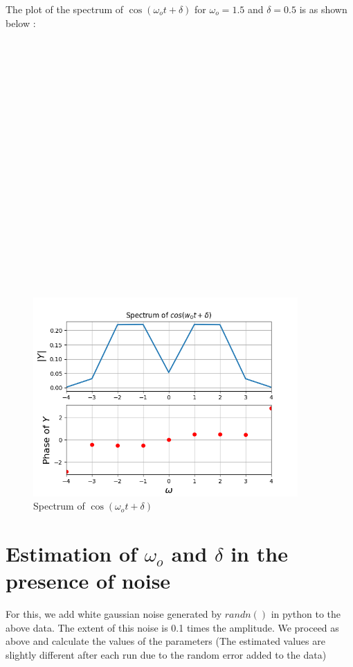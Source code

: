 \documentclass[10pt,a4paper]{article}
\begin{document}
The plot of the spectrum of $\cos (\omega_ot + \delta)$ for $\omega_o = 1.5$ and $\delta = 0.5$ is as shown below : \\\\\\\\\\\\\\\\\\\\\\\\\\\\\\\\\\\\\\\\

\begin{figure}[!tbh]

\includegraphics[width = 0.9\textwidth]{3-spectrum of cos cube(1.5t+0.5) with windowing.png}
\caption{Spectrum of  $\cos(\omega_o t+\delta)$}

\end{figure}

\section{Estimation of $\omega_o$ and $\delta$ in the presence of noise}
For this, we add white gaussian noise generated by $randn()$ in python to the above data. The extent of this noise is 0.1 times the amplitude. We proceed as above and calculate the values of the parameters (The estimated values are slightly different after each run due to the random error added to the data) \\
\end{document}
